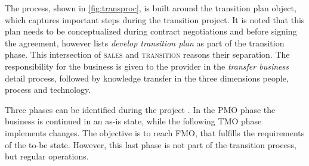 	The process, shown in \Fig \ref{fig:transproc}, is built around the transition plan object, which captures important steps during the transition project. It is noted that this plan needs to be conceptualized during contract negotiations and before signing the agreement, however \cite{deloittehandbook} lists \textit{develop transition plan} as part of the transition phase. This intersection of \textsc{sales} and \textsc{transition} reasons their separation. The responsibility for the business is given to the provider in the \textit{transfer business} detail process, followed by knowledge transfer in the three dimensions people, process and technology. 
	
	Three phases can be identified during the project \citep{bitkom2008, 0273705601}. In the \acrfull{PMO} phase the business is continued in an as-is state, while the following  \acrfull{TMO} phase implements changes. The objective is to reach \acrfull{FMO}, that fulfills the requirements of the to-be state. However, this last phase is not part of the transition process, but regular operations. 
	
